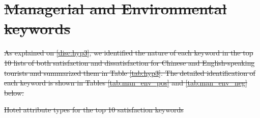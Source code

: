 \documentclass[smallextended,natbib]{svjour3}       %
\providecommand{\DIFdel}[1]{{\protect\color{red}\sout{#1}}}                      %
\providecommand{\DIFdelFL}[1]{\DIFdel{#1}} %
\begin{document}
\section[]{\DIFdel{Managerial and Environmental keywords}}%
\addtocounter{section}{-1}%

\DIFdel{As explained on \ref{disc:hyp3}, we identified the nature of each keyword in the top 10 lists of both satisfaction and dissatisfaction for Chinese and English-speaking tourists and summarized them in Table \ref{tab:hyp3}. The detailed identification of each keyword is shown in Tables \ref{tab:man_env_pos} and \ref{tab:man_env_neg} below.
}%

{%
\DIFdelFL{Hotel attribute types for the top 10 satisfaction keywords}}
\end{document}
